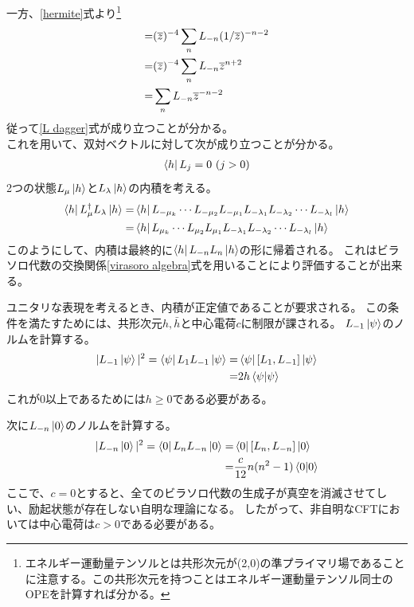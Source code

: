\documentclass[11pt, dvipdfmx]{article}
\numberwithin{equation}{section}
\newcommand{\blankline}{\par\vspace{\baselineskip}} %
\begin{document}
一方、\eqref{hermite}式より\footnote{
    エネルギー運動量テンソルとは共形次元が(2,0)の準プライマリ場であることに注意する。この共形次元を持つことはエネルギー運動量テンソル同士のOPEを計算すれば分かる。
}
\begin{align}
    =&(\overline{z})^{-4}\sum_{n}L_{-n} (1/\overline{z})^{-n-2}\notag\\
    =&(\overline{z})^{-4}\sum_{n}L_{-n} \overline{z}^{n+2}\notag\\
    =&\sum_{n}L_{-n} \overline{z}^{-n-2}
\end{align}
従って\eqref{L dagger}式が成り立つことが分かる。
\\これを用いて、双対ベクトルに対して次が成り立つことが分かる。
\begin{align}
    \bra{h}L_j=0 \ (j>0)\\
\end{align}
2つの状態$L_{\mu}\ket{h}$と$L_{\lambda}\ket{h}$の内積を考える。
\begin{align}
    \bra{h}L_{\mu}^\dagger L_{\lambda}\ket{h}=&\bra{h}L_{-\mu_k}\cdots L_{-\mu_2}L_{-\mu_1}L_{-\lambda_1}L_{-\lambda_2}\cdots L_{-\lambda_l}\ket{h}\\
    =&\bra{h}L_{\mu_k}\cdots L_{\mu_2}L_{\mu_1}L_{-\lambda_1}L_{-\lambda_2}\cdots L_{-\lambda_l}\ket{h}
\end{align}
このようにして、内積は最終的に$\bra{h}L_{-n}L_n\ket{h}$の形に帰着される。
これはビラソロ代数の交換関係\eqref{virasoro algebra}式を用いることにより評価することが出来る。
\blankline

ユニタリな表現を考えるとき、内積が正定値であることが要求される。
この条件を満たすためには、共形次元$h,\bar{h}$と中心電荷$c$に制限が課される。
$L_{-1}\ket{\psi}$のノルムを計算する。
\begin{align}
    |L_{-1}\ket{\psi}|^2=\bra{\psi}L_1 L_{-1}\ket{\psi}=&\bra{\psi}[L_1,L_{-1}]\ket{\psi}\notag\\
    =&2h \braket{\psi}
\end{align}
これが0以上であるためには$h\geq 0$である必要がある。
\blankline
次に$L_{-n}\ket{0}$のノルムを計算する。
\begin{align}
    |L_{-n}\ket{0}|^2=\bra{0}L_n L_{-n}\ket{0}=&\bra{0}[L_n,L_{-n}]\ket{0}\notag\\
    =&\frac{c}{12}n(n^2-1) \braket{0}
\end{align}
ここで、$c=0$とすると、全てのビラソロ代数の生成子が真空を消滅させてしい、励起状態が存在しない自明な理論になる。
したがって、非自明なCFTにおいては中心電荷は$c>0$である必要がある。
\end{document}
